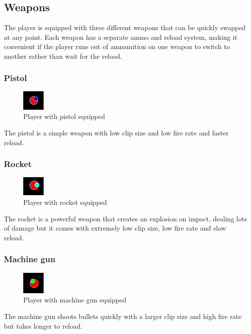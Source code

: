 \documentclass{article}
\begin{document}
\subsection{Weapons}
The player is equipped with three different weapons that can be quickly swapped at any point. Each weapon has a separate ammo and reload system, making it convenient if the player runs out of ammunition on one weapon to switch to another rather than wait for the reload.
\subsubsection{Pistol}
\begin{figure}[H]
\centering
\includegraphics[width=0.1\textwidth, keepaspectratio]{imgs/Gun.png}
\caption{Player with pistol equipped}
\end{figure}
\noindent
The pistol is a simple weapon with low clip size and low fire rate and faster reload.

\subsubsection{Rocket}
\begin{figure}[H]
\centering
\includegraphics[width=0.1\textwidth, keepaspectratio]{imgs/Rocket.png}
\caption{Player with rocket equipped}
\end{figure}
\noindent
The rocket is a powerful weapon that creates an explosion on impact, dealing lots of damage but it comes with extremely low clip size, low fire rate and slow reload.

\subsubsection{Machine gun}
\begin{figure}[H]
\centering
\includegraphics[width=0.1\textwidth, keepaspectratio]{imgs/MachineGun.png}
\caption{Player with machine gun equipped}
\end{figure}
\noindent
The machine gun shoots bullets quickly with a larger clip size and high fire rate but takes longer to reload.
\end{document}
